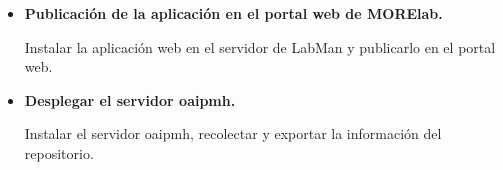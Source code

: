 \begin{itemize}
	\item \textbf{Publicación de la aplicación en el portal web de MORElab.}
	
	Instalar la aplicación web en el servidor de LabMan y publicarlo en el portal web.
	\item \textbf{Desplegar el servidor \acrshort{oaipmh}.}

	Instalar el servidor \acrshort{oaipmh}, recolectar y exportar la información del repositorio.
\end{itemize}